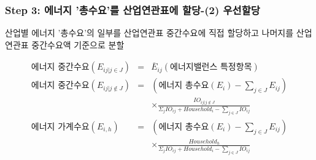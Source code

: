 \documentclass[10pt,compress,slidetop,%
			   hyperref={unicode},xcolor={svgnames},%
			   t]{beamer}
\begin{document}
\begin{frame}
	\frametitle{Step 3: 에너지 '총수요'를 산업연관표에 할당-(2) 우선할당 }
\bigskip
산업별 에너지 '총수요'의 일부를 산업연관표 중간수요에 직접 할당하고 나머지를 산업연관표 중간수요액 기준으로 분할
\smallskip

\begin{small}
\begin{eqnarray*}
\mbox{에너지 중간수요} (E_{ij|j\in J})&=&\overline{E}_{ij}(\mbox{에너지밸런스 특정항목})\\
\mbox{에너지 중간수요} (E_{ij|j \notin J})&=&(\mbox{에너지 총수요}(E_i)-\sum_{j\in J}E_{ij})\\
& &\times\frac{IO_{ij| j \notin J}}{\Sigma_{j}IO_{ij}+Household_i-\sum_{j\in J}IO_{ij}}\\
\mbox{에너지 가계수요} (E_{i,h})&=&(\mbox{에너지 총수요}(E_i)-\sum_{j\in J}E_{ij})\\
& &\times\frac{Household_h}{\Sigma_{j}IO_{ij}+Household_i-\sum_{j\in J}IO_{ij}}
\end{eqnarray*}
\end{small}


\end{frame}
\end{document}
